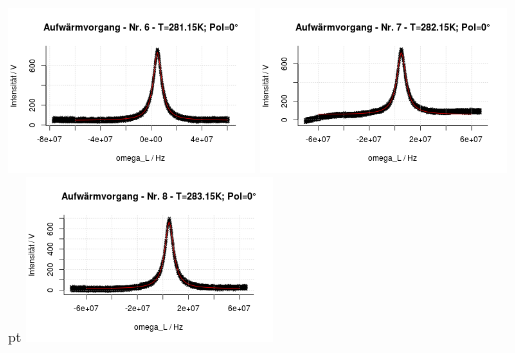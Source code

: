 \documentclass[12pt]{article}
\begin{document}
\begin{minipage}[h!]{\textwidth}
	\includegraphics[width=0.49\textwidth]{figures/warm0-6.png}\vskip -10pt
	\includegraphics[width=0.49\textwidth]{figures/warm0-7.png} pt
	\includegraphics[width=0.49\textwidth]{figures/warm0-8.png}\vskip -10pt
\end{minipage}\newpage
\end{document}
